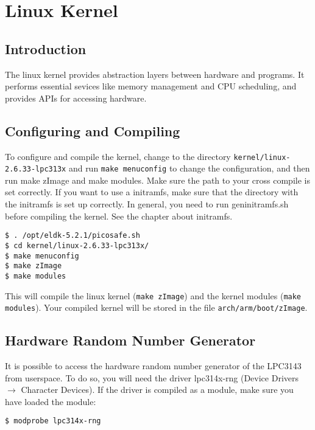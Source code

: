 \chapter{Linux Kernel}

\section{Introduction}

The linux kernel provides abstraction layers between hardware and programs. It
performs essential sevices like memory management and CPU scheduling, and
provides APIs for accessing hardware.

\section{Configuring and Compiling}

To configure and compile the kernel, change to the directory
\texttt{kernel/linux-2.6.33-lpc313x} and run \texttt{make menuconfig} to change the
configuration, and then run make zImage and make modules. Make sure the path to
your cross compile is set correctly. If you want to use a initramfs, make sure
that the directory with the initramfs is set up correctly. In general, you need
to run geninitramfs.sh before compiling the kernel. See the chapter about
initramfs.

\texttt{\$ . /opt/eldk-5.2.1/picosafe.sh} \\
\texttt{\$ cd kernel/linux-2.6.33-lpc313x/} \\
\texttt{\$ make menuconfig} \\
\texttt{\$ make zImage} \\
\texttt{\$ make modules}

This will compile the linux kernel (\texttt{make zImage}) and the kernel modules (\texttt{make modules}). Your compiled kernel will be stored in the file \texttt{arch/arm/boot/zImage}.

\section{Hardware Random Number Generator}

It is possible to access the hardware random number generator of the LPC3143
from userspace.  To do so, you will need the driver lpc314x-rng (Device Drivers
$\rightarrow$ Character Devices). If the driver is compiled as a module, make sure
you have loaded the module:

\texttt{\$ modprobe lpc314x-rng}

